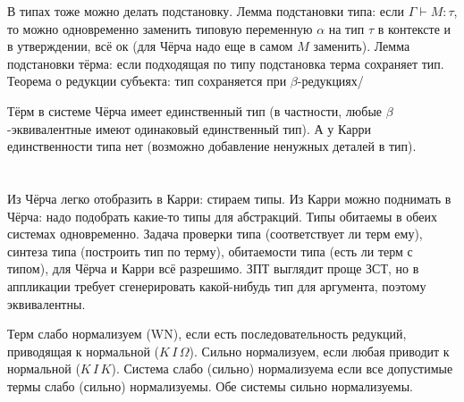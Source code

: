 В типах тоже можно делать подстановку.
Лемма подстановки типа: если $\Gamma \vdash M \colon \tau$, то можно одновременно заменить типовую переменную $\alpha$ на тип $\tau$ в контексте и в
утверждении, всё ок (для Чёрча надо еще в самом $M$ заменить).
Лемма подстановки тёрма: если подходящая по типу подстановка терма сохраняет тип.
Теорема о редукции субъекта: тип сохраняется при $\beta$-редукциях/

Тёрм в системе Чёрча имеет единственный тип (в частности, любые $\beta$-эквивалентные имеют одинаковый единственный тип).
А у Карри единственности типа нет (возможно добавление ненужных деталей в тип).

\section{} %
Из Чёрча легко отобразить в Карри: стираем типы.
Из Карри можно поднимать в Чёрча: надо подобрать какие-то типы для абстракций.
Типы обитаемы в обеих системах одновременно.
Задача проверки типа (соответствует ли терм ему), синтеза типа (построить тип по терму), обитаемости типа
(есть ли терм с типом), для Чёрча и Карри всё разрешимо.
ЗПТ выглядит проще ЗСТ, но в аппликации требует сгенерировать какой-нибудь тип для аргумента, поэтому эквивалентны.

Терм слабо нормализуем (WN), если есть последовательность редукций, приводящая к нормальной ($K\,I\,\Omega$).
Сильно нормализуем, если любая приводит к нормальной ($K\,I\,K$).
Система слабо (сильно) нормализуема если все допустимые термы слабо (сильно) нормализуемы.
Обе системы сильно нормализуемы.

\section{} %

\section{} %

\section{} %

\section{} %

\section{} %

\section{} %

\section{} %
